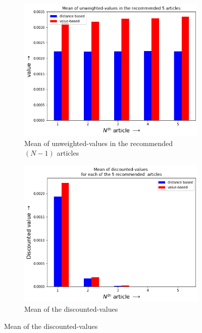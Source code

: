 \documentclass[11]{article}
\begin{document}
\begin{figure}[H]
	\centering
	\begin{subfigure}[t]{0.45\textwidth}
		\centering
		\includegraphics[width=1.1\linewidth]{images/value_abs_recomm.png} 
		\caption{Mean of unweighted-values in the recommended $(N-1)$ articles} \label{im:11}
	\end{subfigure}
	\hfill%
	\begin{subfigure}[t]{0.45\textwidth}
		\centering
		\includegraphics[width=1.1\linewidth]{images/value_weight_recomm.png}
		\caption{Mean of the discounted-values} \label{im:12}
	\end{subfigure}

\end{figure}
\end{document}
